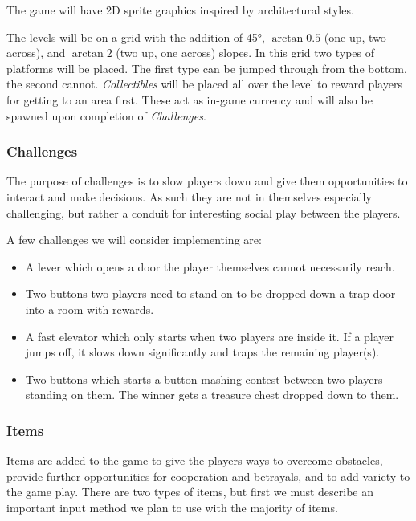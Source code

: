 The game will have 2D sprite graphics inspired by architectural styles.

The levels will be on a grid with the addition of 45°, $\arctan{0.5}$ (one up, two across), and $\arctan{2}$ (two up, one across) slopes. In this grid two types of platforms will be placed. The first type can be jumped through from the bottom, the second cannot. \emph{Collectibles} will be placed all over the level to reward players for getting to an area first. These act as in-game currency and will also be spawned upon completion of \emph{Challenges}.

\subsubsection{Challenges}

The purpose of challenges is to slow players down and give them opportunities to interact and make decisions. As such they are not in themselves especially challenging, but rather a conduit for interesting social play between the players.
\par
A few challenges we will consider implementing are:

\begin{itemize}
    \item A lever which opens a door the player themselves cannot necessarily reach.
    \item Two buttons two players need to stand on to be dropped down a trap door into a room with rewards.
    \item A fast elevator which only starts when two players are inside it. If a player jumps off, it slows down significantly and traps the remaining player(s).
    \item Two buttons which starts a button mashing contest between two players standing on them. The winner gets a treasure chest dropped down to them.
\end{itemize}

\subsubsection{Items}

Items are added to the game to give the players ways to overcome obstacles, provide further opportunities for cooperation and betrayals, and to add variety to the game play. There are two types of items, but first we must describe an important input method we plan to use with the majority of items. 

